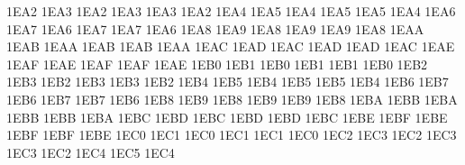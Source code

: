 \setcclcucx 1EA2 1EA3 1EA2 %
\setcclcucx 1EA3 1EA3 1EA2 %
\setcclcucx 1EA4 1EA5 1EA4 %
\setcclcucx 1EA5 1EA5 1EA4 %
\setcclcucx 1EA6 1EA7 1EA6 %
\setcclcucx 1EA7 1EA7 1EA6 %
\setcclcucx 1EA8 1EA9 1EA8 %
\setcclcucx 1EA9 1EA9 1EA8 %
\setcclcucx 1EAA 1EAB 1EAA %
\setcclcucx 1EAB 1EAB 1EAA %
\setcclcucx 1EAC 1EAD 1EAC %
\setcclcucx 1EAD 1EAD 1EAC %
\setcclcucx 1EAE 1EAF 1EAE %
\setcclcucx 1EAF 1EAF 1EAE %
\setcclcucx 1EB0 1EB1 1EB0 %
\setcclcucx 1EB1 1EB1 1EB0 %
\setcclcucx 1EB2 1EB3 1EB2 %
\setcclcucx 1EB3 1EB3 1EB2 %
\setcclcucx 1EB4 1EB5 1EB4 %
\setcclcucx 1EB5 1EB5 1EB4 %
\setcclcucx 1EB6 1EB7 1EB6 %
\setcclcucx 1EB7 1EB7 1EB6 %
\setcclcucx 1EB8 1EB9 1EB8 %
\setcclcucx 1EB9 1EB9 1EB8 %
\setcclcucx 1EBA 1EBB 1EBA %
\setcclcucx 1EBB 1EBB 1EBA %
\setcclcucx 1EBC 1EBD 1EBC %
\setcclcucx 1EBD 1EBD 1EBC %
\setcclcucx 1EBE 1EBF 1EBE %
\setcclcucx 1EBF 1EBF 1EBE %
\setcclcucx 1EC0 1EC1 1EC0 %
\setcclcucx 1EC1 1EC1 1EC0 %
\setcclcucx 1EC2 1EC3 1EC2 %
\setcclcucx 1EC3 1EC3 1EC2 %
\setcclcucx 1EC4 1EC5 1EC4 %
